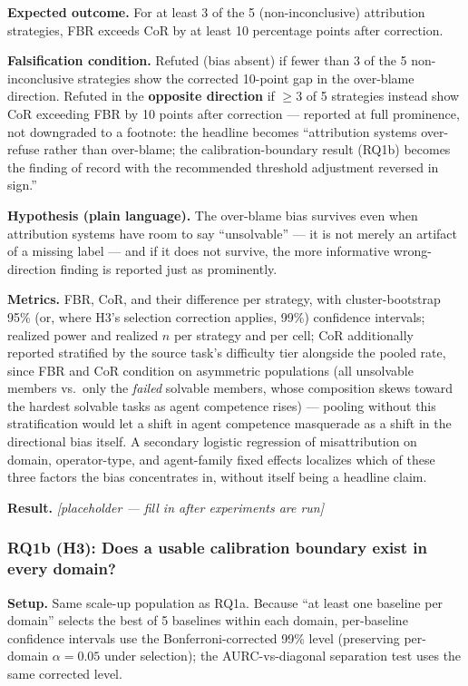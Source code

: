 \documentclass[11pt]{article}
\newcommand{\ph}{\textit{[placeholder --- fill in after experiments are run]}}
\begin{document}
\textbf{Expected outcome.} For at least 3 of the 5 (non-inconclusive) attribution strategies, FBR exceeds CoR by at least 10 percentage points after correction.

\textbf{Falsification condition.} Refuted (bias absent) if fewer than 3 of the 5 non-inconclusive strategies show the corrected 10-point gap in the over-blame direction. Refuted in the \textbf{opposite direction} if $\geq 3$ of 5 strategies instead show CoR exceeding FBR by 10 points after correction --- reported at full prominence, not downgraded to a footnote: the headline becomes ``attribution systems over-refuse rather than over-blame; the calibration-boundary result (RQ1b) becomes the finding of record with the recommended threshold adjustment reversed in sign.''

\textbf{Hypothesis (plain language).} The over-blame bias survives even when attribution systems have room to say ``unsolvable'' --- it is not merely an artifact of a missing label --- and if it does not survive, the more informative wrong-direction finding is reported just as prominently.

\textbf{Metrics.} FBR, CoR, and their difference per strategy, with cluster-bootstrap 95\% (or, where H3's selection correction applies, 99\%) confidence intervals; realized power and realized $n$ per strategy and per cell; CoR additionally reported stratified by the source task's difficulty tier alongside the pooled rate, since FBR and CoR condition on asymmetric populations (all unsolvable members vs.\ only the \emph{failed} solvable members, whose composition skews toward the hardest solvable tasks as agent competence rises) --- pooling without this stratification would let a shift in agent competence masquerade as a shift in the directional bias itself. A secondary logistic regression of misattribution on domain, operator-type, and agent-family fixed effects localizes which of these three factors the bias concentrates in, without itself being a headline claim.

\textbf{Result.} \ph

\subsubsection{RQ1b (H3): Does a usable calibration boundary exist in every domain?}
\textbf{Setup.} Same scale-up population as RQ1a. Because ``at least one baseline per domain'' selects the best of 5 baselines within each domain, per-baseline confidence intervals use the Bonferroni-corrected 99\% level (preserving per-domain $\alpha=0.05$ under selection); the AURC-vs-diagonal separation test uses the same corrected level.
\end{document}
